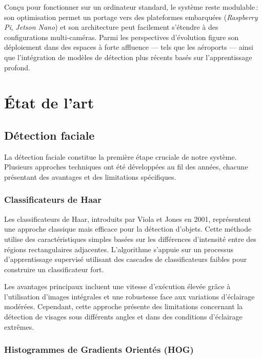 \documentclass[12pt,a4paper]{article}
\begin{document}
Conçu pour fonctionner sur un ordinateur standard, le système reste modulable\,: son optimisation permet un portage vers des plateformes embarquées (\textit{Raspberry Pi}, \textit{Jetson Nano}) et son architecture peut facilement s’étendre à des configurations multi-caméras. Parmi les perspectives d’évolution figure son déploiement dans des espaces à forte affluence — tels que les aéroports — ainsi que l’intégration de modèles de détection plus récents basés sur l’apprentissage profond.

\newpage

\section{État de l'art}

\subsection{Détection faciale}

La détection faciale constitue la première étape cruciale de notre système. Plusieurs approches techniques ont été développées au fil des années, chacune présentant des avantages et des limitations spécifiques.

\subsubsection{Classificateurs de Haar}

Les classificateurs de Haar, introduits par Viola et Jones en 2001, représentent une approche classique mais efficace pour la détection d'objets. Cette méthode utilise des caractéristiques simples basées sur les différences d'intensité entre des régions rectangulaires adjacentes. L'algorithme s'appuie sur un processus d'apprentissage supervisé utilisant des cascades de classificateurs faibles pour construire un classificateur fort.

Les avantages principaux incluent une vitesse d'exécution élevée grâce à l'utilisation d'images intégrales et une robustesse face aux variations d'éclairage modérées. Cependant, cette approche présente des limitations concernant la détection de visages sous différents angles et dans des conditions d'éclairage extrêmes.

\subsubsection{Histogrammes de Gradients Orientés (HOG)}
\end{document}
